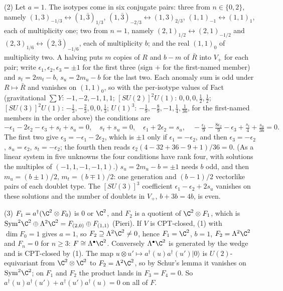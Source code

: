 (2) Let $a = 1$. The isotypes come in six conjugate pairs: three from $n \in \{0, 2\}$, namely $(1,3)_{-1/3} \leftrightarrow (1,\bar{3})_{1/3}$, $(1,\bar{3})_{-2/3} \leftrightarrow (1,3)_{2/3}$, $(1,1)_{-1} \leftrightarrow (1,1)_{1}$, each of multiplicity one; two from $n = 1$, namely $(2,1)_{1/2} \leftrightarrow (2,1)_{-1/2}$ and $(2,3)_{1/6} \leftrightarrow (2,\bar{3})_{-1/6}$, each of multiplicity $b$; and the real $(1,1)_{0}$ of multiplicity two. A halving puts $m$ copies of $R$ and $b - m$ of $\bar{R}$ into $V_{+}$ for each pair; write $\epsilon_{1}, \epsilon_{2}, \epsilon_{3} = \pm1$ for the first three (sign $+$ for the first-named member) and $s_{t} = 2m_{t} - b$, $s_{u} = 2m_{u} - b$ for the last two. Each anomaly sum is odd under $R \mapsto \bar{R}$ and vanishes on $(1,1)_{0}$, so with the per-isotype values of Fact  (gravitational $\sum Y$: $-1, -2, -1, 1, 1$; $[SU(2)]^{2}U(1)$: $0, 0, 0, \tfrac12, \tfrac12$; $[SU(3)]^{2}U(1)$: $-\tfrac13, -\tfrac23, 0, 0, \tfrac13$; $U(1)^{3}$: $-\tfrac19, -\tfrac89, -1, \tfrac14, \tfrac{1}{36}$, for the first-named members in the order above) the conditions are
\[
-\epsilon_{1} - 2\epsilon_{2} - \epsilon_{3} + s_{t} + s_{u} = 0,\quad s_{t} + s_{u} = 0,\quad \epsilon_{1} + 2\epsilon_{2} = s_{u},\quad -\tfrac{\epsilon_{1}}{9} - \tfrac{8\epsilon_{2}}{9} - \epsilon_{3} + \tfrac{s_{t}}{4} + \tfrac{s_{u}}{36} = 0.
\]
The first two give $\epsilon_{3} = -\epsilon_{1} - 2\epsilon_{2}$, which is $\pm1$ only if $\epsilon_{1} = -\epsilon_{2}$, and then $\epsilon_{3} = -\epsilon_{2}$, $s_{u} = \epsilon_{2}$, $s_{t} = -\epsilon_{2}$; the fourth then reads $\epsilon_{2}(4 - 32 + 36 - 9 + 1)/36 = 0$. (As a linear system in five unknowns the four conditions have rank four, with solutions the multiples of $(-1, 1, -1, -1, 1)$.) $s_{u} = 2m_{u} - b = \pm1$ needs $b$ odd, and then $m_{u} = (b \pm 1)/2$, $m_{t} = (b \mp 1)/2$: one generation and $(b - 1)/2$ vectorlike pairs of each doublet type. The $[SU(3)]^{3}$ coefficient $\epsilon_{1} - \epsilon_{2} + 2s_{u}$ vanishes on these solutions and the number of doublets in $V_{+}$, $b + 3b = 4b$, is even.

(3) $F_{1} = a^{\dagger}(\C^{2} \otimes F_{0})$ is $0$ or $\C^{2}$, and $F_{2}$ is a quotient of $\C^{2} \otimes F_{1}$, which is $\mathrm{Sym}^{2}\C^{2} \oplus \Lambda^{2}\C^{2} = F_{(2,0)} \oplus F_{(1,1)}$ (Pieri). If $V$ is CPT-closed, (1) with $\dim F_{0} = 1$ gives $a = 1$, so $F_{2} \supseteq \Lambda^{2}\C^{2} \ne 0$, hence $F_{1} = \C^{2}$, $b = 1$, $F_{2} = \Lambda^{2}\C^{2}$ and $F_{n} = 0$ for $n \ge 3$: $F \cong \Lambda^{\bullet}\C^{2}$. Conversely $\Lambda^{\bullet}\C^{2}$ is generated by the wedge and is CPT-closed by (1). The map $u \otimes u' \mapsto a^{\dagger}(u)a^{\dagger}(u')\lvert 0 \rangle$ is $U(2)$-equivariant from $\C^{2} \otimes \C^{2}$ to $F_{2} = \Lambda^{2}\C^{2}$, so by Schur's lemma it vanishes on $\mathrm{Sym}^{2}\C^{2}$; on $F_{1}$ and $F_{2}$ the product lands in $F_{3} = F_{4} = 0$. So $a^{\dagger}(u)a^{\dagger}(u') + a^{\dagger}(u')a^{\dagger}(u) = 0$ on all of $F$.


